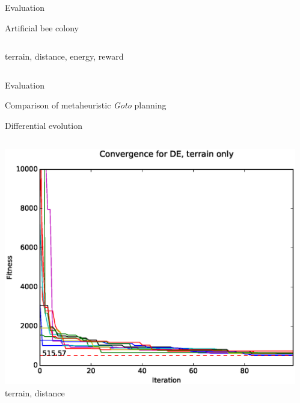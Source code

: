 \documentclass[9pt]{beamer}
\begin{document}
\begin{frame}{Evaluation}
\begin{block}{Artificial bee colony}
\begin{columns}
\begin{column}{0.5\textwidth}
\begin{center}
                    \linebreak
                    terrain, distance, energy, reward
                \end{center}
            \end{column}
        \end{columns}
    \end{block}
\end{frame}

\begin{frame}{Evaluation}
    \begin{block}{Comparison of metaheuristic \textit{Goto} planning}
    \end{block}
    \begin{block}{Differential evolution}
        \begin{columns}
            \begin{column}{0.5\textwidth}
                \begin{center}
                    \includegraphics[width=\textwidth,trim={.75cm .75cm 0cm 1cm},clip]{img/conv_DE_a.eps}
                    \linebreak
                    terrain, distance
                \end{center}
            \end{column}
            \begin{column}{0.5\textwidth}
                \begin{center}

\end{center}
\end{column}
\end{columns}
\end{block}
\end{frame}
\end{document}
